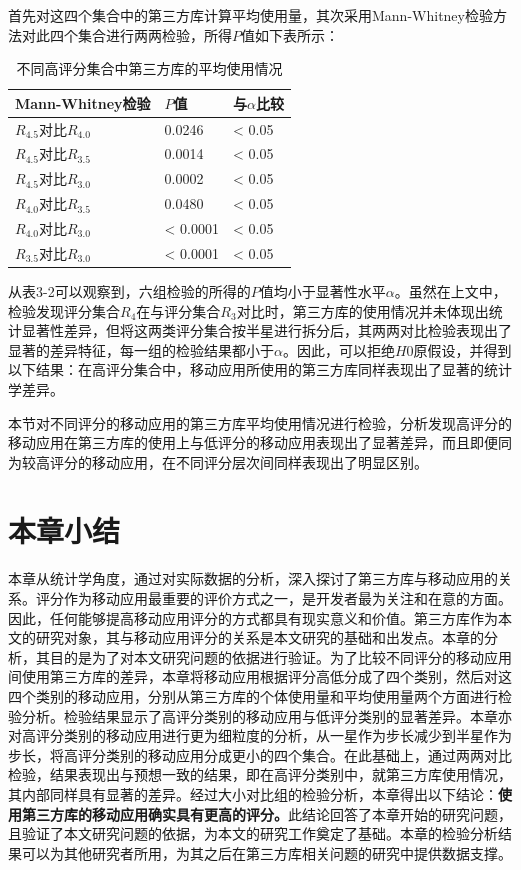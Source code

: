 首先对这四个集合中的第三方库计算平均使用量，其次采用Mann-Whitney检验方法对此四个集合进行两两检验，所得$P$值如下表所示：
\begin{table}
\centering
\caption{不同高评分集合中第三方库的平均使用情况}
\begin{tabular}{C{1.8in}C{1.2in}C{1in}}
\hline
\hline
Mann-Whitney检验 & $P$值 & 与$\alpha$比较 \\
\hline
$R_{4.5}$对比$R_{4.0}$ & 0.0246 & < 0.05 \\
$R_{4.5}$对比$R_{3.5}$ & 0.0014 & < 0.05 \\
$R_{4.5}$对比$R_{3.0}$ & 0.0002 & < 0.05 \\
$R_{4.0}$对比$R_{3.5}$ & 0.0480 & < 0.05 \\
$R_{4.0}$对比$R_{3.0}$ & < 0.0001 & < 0.05 \\
$R_{3.5}$对比$R_{3.0}$ & < 0.0001 & < 0.05 \\
\hline
\hline
\end{tabular}
\end{table}

从表3-2可以观察到，六组检验的所得的$P$值均小于显著性水平$\alpha$。虽然在上文中，检验发现评分集合$R_4$在与评分集合$R_3$对比时，第三方库的使用情况并未体现出统计显著性差异，但将这两类评分集合按半星进行拆分后，其两两对比检验表现出了显著的差异特征，每一组的检验结果都小于$\alpha$。因此，可以拒绝$H0$原假设，并得到以下结果：在高评分集合中，移动应用所使用的第三方库同样表现出了显著的统计学差异。

本节对不同评分的移动应用的第三方库平均使用情况进行检验，分析发现高评分的移动应用在第三方库的使用上与低评分的移动应用表现出了显著差异，而且即便同为较高评分的移动应用，在不同评分层次间同样表现出了明显区别。



\section{本章小结}
本章从统计学角度，通过对实际数据的分析，深入探讨了第三方库与移动应用的关系。评分作为移动应用最重要的评价方式之一，是开发者最为关注和在意的方面。因此，任何能够提高移动应用评分的方式都具有现实意义和价值。第三方库作为本文的研究对象，其与移动应用评分的关系是本文研究的基础和出发点。本章的分析，其目的是为了对本文研究问题的依据进行验证。为了比较不同评分的移动应用间使用第三方库的差异，本章将移动应用根据评分高低分成了四个类别，然后对这四个类别的移动应用，分别从第三方库的个体使用量和平均使用量两个方面进行检验分析。检验结果显示了高评分类别的移动应用与低评分类别的显著差异。本章亦对高评分类别的移动应用进行更为细粒度的分析，从一星作为步长减少到半星作为步长，将高评分类别的移动应用分成更小的四个集合。在此基础上，通过两两对比检验，结果表现出与预想一致的结果，即在高评分类别中，就第三方库使用情况，其内部同样具有显著的差异。经过大小对比组的检验分析，本章得出以下结论：\textbf{使用第三方库的移动应用确实具有更高的评分。}此结论回答了本章开始的研究问题，且验证了本文研究问题的依据，为本文的研究工作奠定了基础。本章的检验分析结果可以为其他研究者所用，为其之后在第三方库相关问题的研究中提供数据支撑。